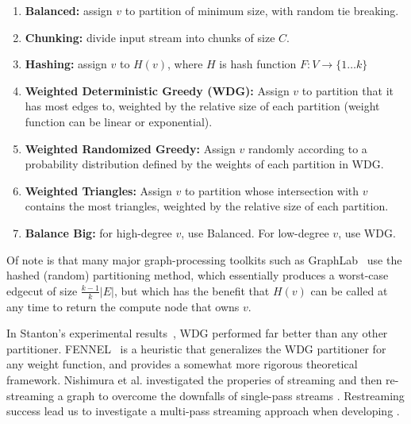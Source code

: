 \begin{enumerate}
\item \textbf{Balanced:} assign $v$ to partition of minimum size, with random tie breaking.
\item \textbf{Chunking:} divide input stream into chunks of size $C$.
\item \textbf{Hashing:} assign $v$ to $H(v)$, where $H$ is hash function $F:V\to\{1\dots k\}$
\item \textbf{Weighted Deterministic Greedy (WDG):} Assign $v$ to partition that it has most edges to, weighted by the relative size of each partition (weight function can be linear or exponential).
\item \textbf{Weighted Randomized Greedy:} Assign $v$ randomly according to a probability distribution defined by the weights of each partition in WDG.
\item \textbf{Weighted Triangles:} Assign $v$ to partition whose intersection with $v$ contains the most triangles, weighted by the relative size of each partition.
\item \textbf{Balance Big:} for high-degree $v$, use Balanced. For low-degree $v$, use WDG.
\end{enumerate}

Of note is that many major graph-processing toolkits such as GraphLab~\cite{Low:2012:DGF:2212351.2212354} use the hashed (random) partitioning method, which essentially produces a worst-case edgecut of size $\frac{k-1}{k}|E|$, but which has the benefit that $H(v)$ can be called at any time to return the compute node that owns $v$.


In Stanton's experimental results~\cite{Stanton:2012:SGP:2339530.2339722}, WDG performed far better than any other partitioner.
FENNEL~\cite{tsourakakis2012fennel} is a heuristic that generalizes the WDG partitioner for any weight function, and provides a somewhat more rigorous theoretical framework.
Nishimura et al. investigated the properies of streaming and then re-streaming a graph to overcome the downfalls of single-pass streams \cite{nishimura2013restream}.
Restreaming success lead us to investigate a multi-pass streaming approach when developing \ourmethod.
